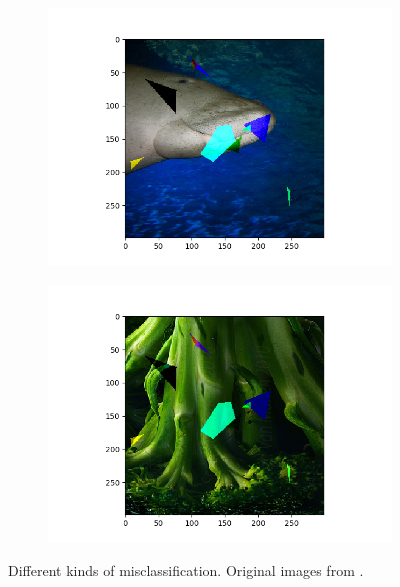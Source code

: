 \documentclass[conference]{IEEEtran}
\begin{document}
\begin{figure}[htbp]
\begin{subfigure}[t]{.4\textwidth}
  \centering
  \includegraphics[width=1\linewidth]{fig/misclass3.png}
\end{subfigure}
\begin{subfigure}[t]{.4\textwidth}
  \centering
  \includegraphics[width=1\linewidth]{fig/misclass4.png}
\end{subfigure}
\caption{Different kinds of misclassification. Original images from \cite{imagenet}.}
\label{fig:Misclassify}
\end{figure}
\end{document}
